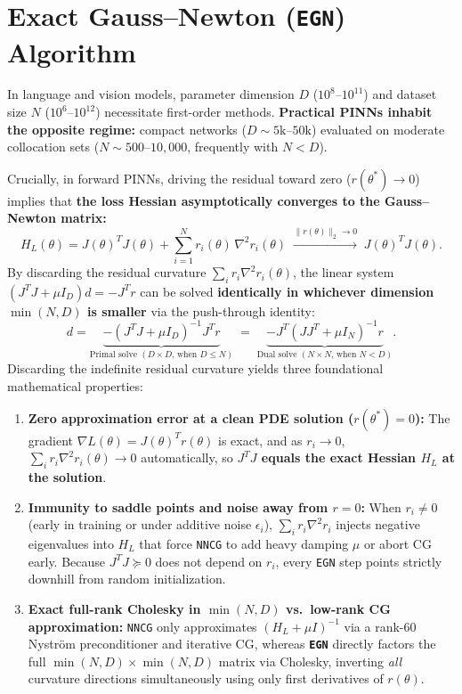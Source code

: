\documentclass[10pt]{article}
\begin{document}
\section{Exact Gauss--Newton (\texttt{EGN}) Algorithm}

In language and vision models, parameter dimension $D$ ($10^8\text{--}10^{11}$) and dataset size $N$ ($10^6\text{--}10^{12}$) necessitate first-order methods. \textbf{Practical PINNs inhabit the opposite regime:} compact networks ($D \sim 5\text{k}\text{--}50\text{k}$) evaluated on moderate collocation sets ($N \sim 500\text{--}10{,}000$, frequently with $N < D$).

Crucially, in forward PINNs, driving the residual toward zero ($r(\theta^*) \to 0$) implies that \textbf{the loss Hessian asymptotically converges to the Gauss--Newton matrix:}
\begin{equation}
H_L(\theta) = J(\theta)^T J(\theta) + \sum_{i=1}^N r_i(\theta) \, \nabla^2 r_i(\theta) \;\xrightarrow{\|r(\theta)\|_2 \to 0}\; J(\theta)^T J(\theta).
\label{eq:asymptotic}
\end{equation}
By discarding the residual curvature $\sum_i r_i \nabla^2 r_i(\theta)$, the linear system $(J^T J + \mu I_D) d = -J^T r$ can be solved \textbf{identically in whichever dimension $\min(N, D)$ is smaller} via the push-through identity:
\begin{equation}
d = \underbrace{-(J^T J + \mu I_D)^{-1} J^T r}_{\text{Primal solve } (D \times D\text{, when } D \le N)} \;=\; \underbrace{-J^T (J J^T + \mu I_N)^{-1} r}_{\text{Dual solve } (N \times N\text{, when } N < D)}.
\label{eq:primal_dual}
\end{equation}
Discarding the indefinite residual curvature yields three foundational mathematical properties:
\begin{enumerate}[leftmargin=1.4em,itemsep=0.10em,topsep=0.10em]
    \item \textbf{Zero approximation error at a clean PDE solution ($r(\theta^*) = 0$):} The gradient $\nabla L(\theta) = J(\theta)^T r(\theta)$ is exact, and as $r_i \to 0$, $\sum_i r_i \nabla^2 r_i(\theta) \to 0$ automatically, so \textbf{$J^T J$ equals the exact Hessian $H_L$ at the solution}.
    \item \textbf{Immunity to saddle points and noise away from $r = 0$:} When $r_i \neq 0$ (early in training or under additive noise $\epsilon_i$), $\sum_i r_i \nabla^2 r_i$ injects negative eigenvalues into $H_L$ that force \texttt{NNCG} to add heavy damping $\mu$ or abort CG early. Because $J^T J \succeq 0$ does not depend on $r_i$, every \texttt{EGN} step points strictly downhill from random initialization.
    \item \textbf{Exact full-rank Cholesky in $\min(N, D)$ vs.\ low-rank CG approximation:} \texttt{NNCG} only approximates $(H_L + \mu I)^{-1}$ via a rank-60 Nystr\"om preconditioner and iterative CG, whereas \textbf{\texttt{EGN}} directly factors the full $\min(N, D) \times \min(N, D)$ matrix via Cholesky, inverting \emph{all} curvature directions simultaneously using only first derivatives of $r(\theta)$.
\end{enumerate}
\end{document}
